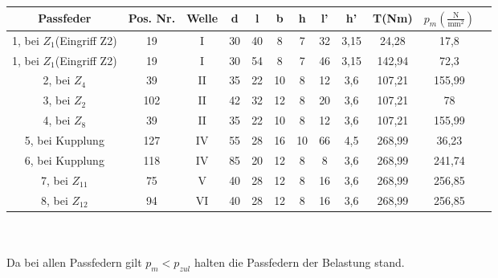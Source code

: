\begin{tabular}{|c|c|c|c|c|c|c|c|c|c|c|c|}\hline
	 Passfeder & Pos. Nr. &Welle & d & l & b & h & l' & h' & T(Nm) & $p_m(\frac{\text{N}}{\text{mm}^2})$ \\ \hline \hline
	 1, bei $Z_1$(Eingriff Z2) & 19 & $\mathrm{I}$ &30 & 40 & 8 & 7 & 32 & 3,15 & 24,28 & 17,8 \\ \hline
	 1, bei $Z_1$(Eingriff Z2) & 19 & $\mathrm{I}$ &30 & 54 & 8 & 7 & 46 & 3,15 & 142,94 & 72,3 \\ \hline
	 2, bei $Z_4$ & 39 &$\mathrm{II}$ & 35 & 22 & 10 & 8 & 12 & 3,6 & 107,21 & 155,99 \\ \hline
	 3, bei $Z_2$ & 102 &$\mathrm{II}$ & 42 & 32 & 12 & 8 & 20 & 3,6 & 107,21 & 78 \\ \hline
	4, bei $Z_8$ & 39 &$\mathrm{II}$ & 35 & 22 & 10 & 8 & 12 & 3,6 & 107,21 & 155,99 \\ \hline
	5, bei Kupplung & 127 & $\mathrm{IV}$ & 55 & 28 & 16 & 10 & 66 & 4,5 & 268,99 & 36,23 \\ \hline
	 6, bei Kupplung & 118 &$\mathrm{IV}$ & 85 & 20 & 12 & 8 & 8 & 3,6 & 268,99 & 241,74 \\ \hline
	 7, bei $Z_{11}$ & 75 &$\mathrm{V}$ & 40 & 28 & 12 & 8 & 16 & 3,6 & 268,99 & 256,85 \\ \hline
	 8, bei $Z_{12}$ & 94 &$\mathrm{VI}$ & 40 & 28 & 12 & 8 & 16 & 3,6 & 268,99 & 256,85 \\ \hline
\end{tabular} \\
\vspace{.5cm}
\\ Da bei allen Passfedern gilt $p_m < p_{zul}$ halten die Passfedern der Belastung stand.